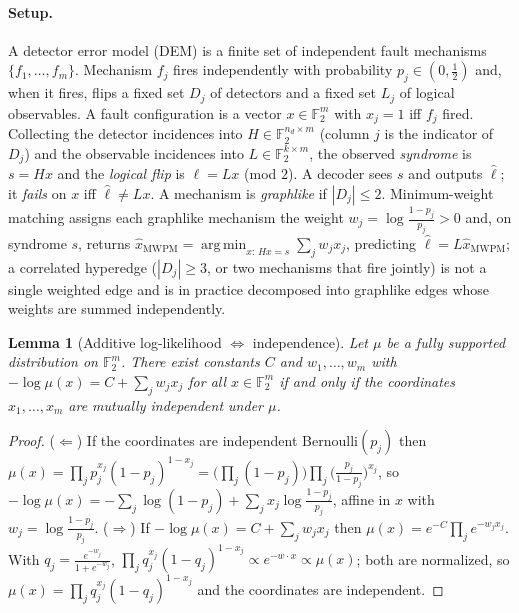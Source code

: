 \documentclass[aps,prxquantum,twocolumn,superscriptaddress,nofootinbib,longbibliography]{revtex4-2}
\newtheorem{lemma}[theorem]{Lemma}
\DeclareMathOperator*{\argmin}{arg\,min}
\newcommand{\F}{\mathbb{F}}
\newcommand{\abs}[1]{\left\lvert #1 \right\rvert}
\begin{document}
\paragraph{Setup.}
A detector error model (DEM) is a finite set of independent fault mechanisms
$\{f_1,\dots,f_m\}$. Mechanism $f_j$ fires independently with probability
$p_j\in(0,\tfrac12)$ and, when it fires, flips a fixed set $D_j$ of detectors and
a fixed set $L_j$ of logical observables. A fault configuration is a vector
$x\in\F_2^m$ with $x_j=1$ iff $f_j$ fired. Collecting the detector incidences into
$H\in\F_2^{n_d\times m}$ (column $j$ is the indicator of $D_j$) and the
observable incidences into $L\in\F_2^{k\times m}$, the observed \emph{syndrome}
is $s=Hx$ and the \emph{logical flip} is $\ell=Lx$ (mod $2$). A decoder sees $s$
and outputs $\hat\ell$; it \emph{fails} on $x$ iff $\hat\ell\neq Lx$. A mechanism
is \emph{graphlike} if $\abs{D_j}\le 2$. Minimum-weight matching assigns each
graphlike mechanism the weight $w_j=\log\frac{1-p_j}{p_j}>0$ and, on syndrome
$s$, returns $\hat x_{\mathrm{MWPM}}=\argmin_{x:\,Hx=s}\sum_j w_j x_j$, predicting
$\hat\ell=L\hat x_{\mathrm{MWPM}}$; a correlated hyperedge ($\abs{D_j}\ge3$, or
two mechanisms that fire jointly) is not a single weighted edge and is in
practice decomposed into graphlike edges whose weights are summed independently.

\begin{lemma}[Additive log-likelihood $\Leftrightarrow$ independence]
\label{lem:additive}
Let $\mu$ be a fully supported distribution on $\F_2^m$. There exist constants
$C$ and $w_1,\dots,w_m$ with $-\log\mu(x)=C+\sum_{j}w_j x_j$ for all $x\in\F_2^m$
if and only if the coordinates $x_1,\dots,x_m$ are mutually independent under
$\mu$.
\end{lemma}

\begin{proof}
($\Leftarrow$) If the coordinates are independent Bernoulli$(p_j)$ then
$\mu(x)=\prod_j p_j^{x_j}(1-p_j)^{1-x_j}=\big(\textstyle\prod_j(1-p_j)\big)\prod_j\big(\tfrac{p_j}{1-p_j}\big)^{x_j}$,
so $-\log\mu(x)=-\sum_j\log(1-p_j)+\sum_j x_j\log\tfrac{1-p_j}{p_j}$, affine in
$x$ with $w_j=\log\frac{1-p_j}{p_j}$.
($\Rightarrow$) If $-\log\mu(x)=C+\sum_j w_j x_j$ then
$\mu(x)=e^{-C}\prod_j e^{-w_j x_j}$. With $q_j=\frac{e^{-w_j}}{1+e^{-w_j}}$,
$\prod_j q_j^{x_j}(1-q_j)^{1-x_j}\propto e^{-w\cdot x}\propto\mu(x)$; both are
normalized, so $\mu(x)=\prod_j q_j^{x_j}(1-q_j)^{1-x_j}$ and the coordinates are
independent.
\end{proof}
\end{document}

